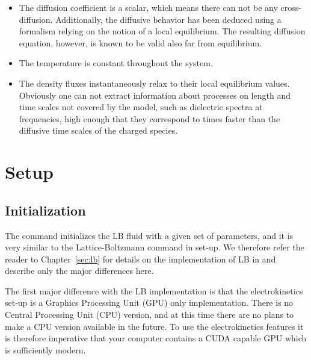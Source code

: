 \begin{itemize}
	\item The diffusion coefficient is a scalar, which means there can not be any
	cross-diffusion. Additionally, the diffusive behavior has been deduced using
	a formalism relying on the notion of a local equilibrium. The resulting
	diffusion equation, however, is known to be valid also far from equilibrium.
	
	\item The temperature is constant throughout the system.
	
	\item The density fluxes instantaneously relax to their local equilibrium
	values. Obviously one can not extract information about processes on length
	and time scales not covered by the model, such as dielectric spectra at
	frequencies, high enough that they correspond to times faster than the
	diffusive time scales of the charged species.
\end{itemize}

\section{Setup}

\subsection{\label{ssec:ek-init}Initialization}

\begin{essyntax}
  \begin{features}
  \end{features}
\end{essyntax}
The  command initializes the LB fluid with a given
set of parameters, and it is very similar to the \es{} Lattice-Boltzmann 
 command in set-up. We therefore refer the reader to 
Chapter~\ref{sec:lb} for details on the implementation of LB in \es{} and 
describe only the major differences here. 

The first major difference with the LB implementation is that the 
electrokinetics set-up is a Graphics Processing Unit (GPU) only implementation. 
There is no Central Processing Unit (CPU) version, and at this time there are no
plans to make a CPU version available in the future. To use the electrokinetics
features it is therefore imperative that your computer contains a CUDA capable
GPU which is sufficiently modern. 

